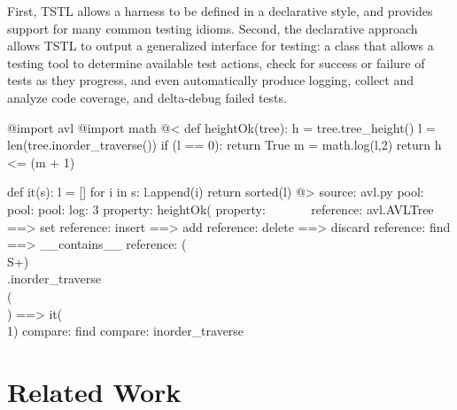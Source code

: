 \documentclass{sig-alternate}
\begin{document}
First, TSTL allows a harness to be defined in a declarative style,
and provides support for many common testing idioms.  Second, the
declarative approach allows TSTL to output a generalized interface for
testing:  a class that allows a testing tool to determine available
test actions, check for success or failure of tests as they progress,
and even automatically produce logging, collect and analyze code
coverage, and delta-debug failed tests.


\begin{code}
@import avl
@import math
\vspace{0.1in}
@<
def heightOk(tree):
     h = tree.tree\_height()
     l = len(tree.inorder\_traverse())
     if (l == 0):
        return True
     m = math.log(l,2)
     return h <= (m + 1)

 def it(s):
     l = []
     for i in s:
        l.append(i)
     return sorted(l)
@>
\vspace{0.1in}
source: avl.py
\vspace{0.1in}
pool: %
pool: %
pool: %
\vspace{0.1in}
log: 3 %
\vspace{0.1in}
property: heightOk(%
property: %
\vspace{0.1in}
~%
~%
~%
~%
\vspace{0.1in}
reference: avl.AVLTree ==> set
reference: insert ==> add
reference: delete ==> discard
reference: find ==> \_\_contains\_\_
reference: (\\S+)\\.inorder\_traverse\\(\\) ==> it(\\1)
\vspace{0.1in}
compare: find
compare: inorder\_traverse
\end{code}

\section{Related Work}
\end{document}
